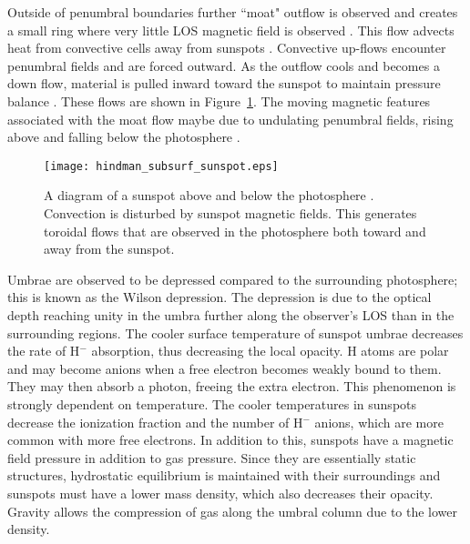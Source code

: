 Outside of penumbral boundaries further ``moat" outflow is observed and creates a small ring where very little \gls{LOS} magnetic field is observed \citep{Brickhouse:1988}. This flow advects heat from convective cells away from sunspots \citep{Fox:1991}. Convective up-flows encounter penumbral fields and are forced outward. As the outflow cools and becomes a down flow, material is pulled inward toward the sunspot to maintain pressure balance \citep{Hindman:2009}. These flows are shown in Figure~\ref{fig:sunspotstruct}. The moving magnetic features associated with the moat flow maybe due to undulating penumbral fields, rising above and falling below the photosphere \citep{Weiss:2006}.

\begin{figure}[t]
\centerline{\texttt{[image: hindman\_subsurf\_sunspot.eps]}}
\caption[A diagram of a sunspot above and below the photosphere.]{A diagram of a sunspot above and below the photosphere \citep[from][]{Hindman:2009}. Convection is disturbed by sunspot magnetic fields. This generates toroidal flows that are observed in the photosphere both toward and away from the sunspot.}
\label{fig:sunspotstruct}
\end{figure}


Umbrae are observed to be depressed compared to the surrounding photosphere; this is known as the Wilson depression. The depression is due to the optical depth reaching unity in the umbra further along the observer's LOS than in the surrounding regions. The cooler surface temperature of sunspot umbrae decreases the rate of H$^{-}$ absorption, thus decreasing the local opacity. H atoms are polar and may become anions when a free electron becomes weakly bound to them. They may then absorb a photon, freeing the extra electron. This phenomenon is strongly dependent on temperature. 
The cooler temperatures in sunspots decrease the ionization fraction and the number of H$^{-}$ anions, which are more common with more free electrons. 
In addition to this, sunspots have a magnetic field pressure in addition to gas pressure. Since they are essentially static structures, hydrostatic equilibrium is maintained with their surroundings and sunspots must have a lower mass density, which also decreases their opacity. Gravity allows the compression of gas along the umbral column due to the lower density. %

